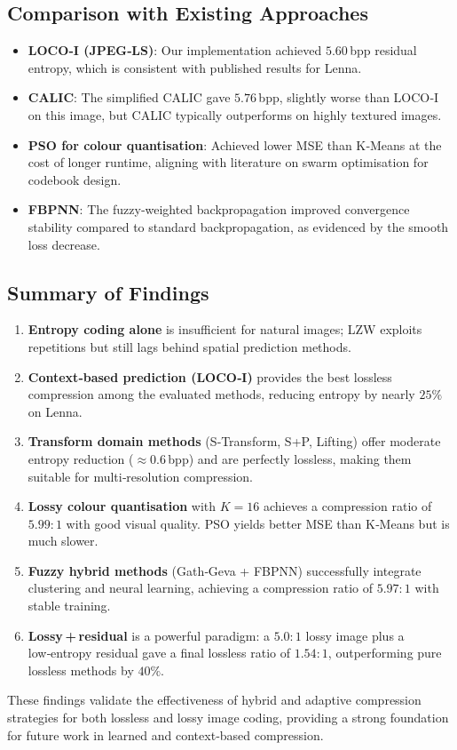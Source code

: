 \subsection{Comparison with Existing Approaches}

\begin{itemize}
    \item \textbf{LOCO‑I (JPEG‑LS)}: Our implementation achieved $5.60$ bpp residual entropy, which is consistent with published results for Lenna.
    \item \textbf{CALIC}: The simplified CALIC gave $5.76$ bpp, slightly worse than LOCO‑I on this image, but CALIC typically outperforms on highly textured images.
    \item \textbf{PSO for colour quantisation}: Achieved lower MSE than K‑Means at the cost of longer runtime, aligning with literature on swarm optimisation for codebook design.
    \item \textbf{FBPNN}: The fuzzy‑weighted backpropagation improved convergence stability compared to standard backpropagation, as evidenced by the smooth loss decrease.
\end{itemize}

\subsection{Summary of Findings}

\begin{enumerate}
    \item \textbf{Entropy coding alone} is insufficient for natural images; LZW exploits repetitions but still lags behind spatial prediction methods.
    \item \textbf{Context‑based prediction (LOCO‑I)} provides the best lossless compression among the evaluated methods, reducing entropy by nearly $25\%$ on Lenna.
    \item \textbf{Transform domain methods} (S‑Transform, S+P, Lifting) offer moderate entropy reduction ($\approx 0.6$ bpp) and are perfectly lossless, making them suitable for multi‑resolution compression.
    \item \textbf{Lossy colour quantisation} with $K=16$ achieves a compression ratio of $5.99:1$ with good visual quality. PSO yields better MSE than K‑Means but is much slower.
    \item \textbf{Fuzzy hybrid methods} (Gath‑Geva + FBPNN) successfully integrate clustering and neural learning, achieving a compression ratio of $5.97:1$ with stable training.
    \item \textbf{Lossy + residual} is a powerful paradigm: a $5.0:1$ lossy image plus a low‑entropy residual gave a final lossless ratio of $1.54:1$, outperforming pure lossless methods by $40\%$.
\end{enumerate}

These findings validate the effectiveness of hybrid and adaptive compression strategies for both lossless and lossy image coding, providing a strong foundation for future work in learned and context‑based compression.
